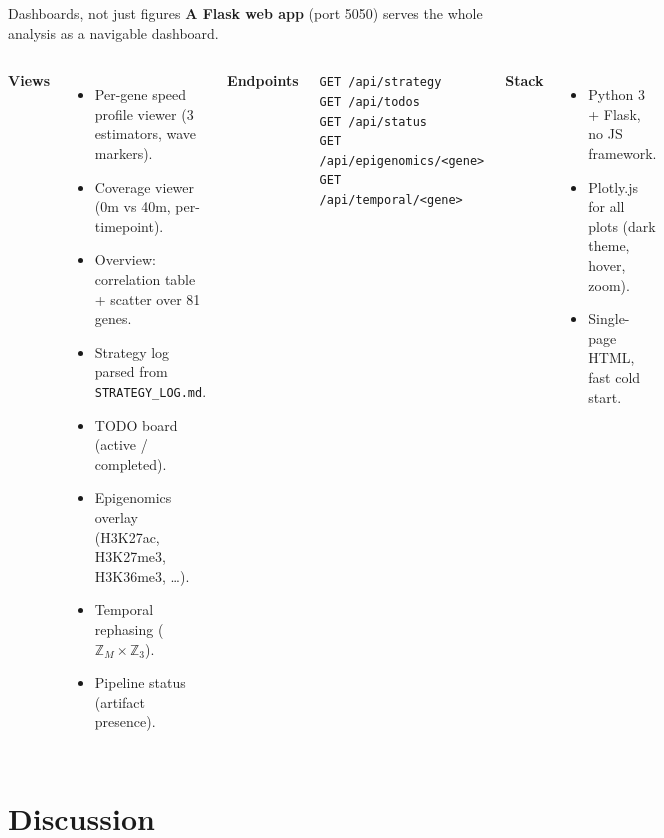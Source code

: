 \documentclass[aspectratio=169,10pt]{beamer}
\begin{document}
\begin{frame}{Dashboards, not just figures}
\textbf{A Flask web app} (port 5050) serves the whole analysis
as a navigable dashboard.

\medskip
\begin{columns}[T]
\textbf{Views}
\begin{itemize}\small
  \item Per-gene speed profile viewer (3 estimators, wave markers).
  \item Coverage viewer (0m vs 40m, per-timepoint).
  \item Overview: correlation table + scatter over 81 genes.
  \item Strategy log parsed from \texttt{STRATEGY\_LOG.md}.
  \item TODO board (active / completed).
  \item Epigenomics overlay (H3K27ac, H3K27me3, H3K36me3, \ldots).
  \item Temporal rephasing ($\mathbb{Z}_M \times \mathbb{Z}_3$).
  \item Pipeline status (artifact presence).
\end{itemize}
\textbf{Endpoints}
\begin{block}{}
\small
\texttt{GET /api/strategy} \\
\texttt{GET /api/todos} \\
\texttt{GET /api/status} \\
\texttt{GET /api/epigenomics/<gene>} \\
\texttt{GET /api/temporal/<gene>}
\end{block}
\textbf{Stack}
\begin{itemize}\small
  \item Python 3 + Flask, no JS framework.
  \item Plotly.js for all plots (dark theme, hover, zoom).
  \item Single-page HTML, fast cold start.
\end{itemize}
\end{columns}
\end{frame}

\section{Discussion}
\end{document}
